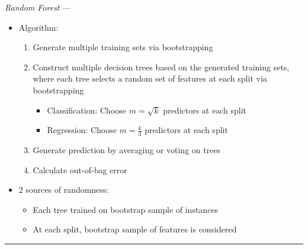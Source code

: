 \emph{Random Forest} --- 
\begin{itemize}
    \item Algorithm:
    \begin{enumerate}
        \item Generate multiple training sets via bootstrapping
        \item Construct multiple decision trees based on the generated training sets, where each tree selects a random set of features at each split via bootstrapping
        \begin{itemize}
            \item Classification: Choose $m = \sqrt{k}$ predictors at each split
            \item Regression: Choose $m = \frac{k}{3}$ predictors at each split
        \end{itemize}
        \item Generate prediction by averaging or voting on trees
        \item Calculate out-of-bag error
    \end{enumerate}
    \item 2 sources of randomness:
    \begin{itemize}
        \item Each tree trained on bootstrap sample of instances
        \item At each split, bootstrap sample of features is considered
    \end{itemize}
\end{itemize}

{\color{lightgray}\hrule height 0.001mm}

